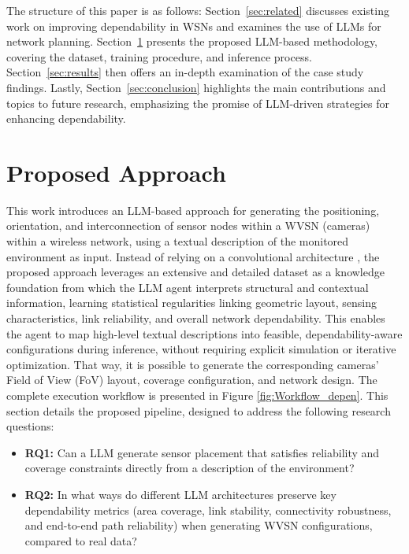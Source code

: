 The structure of this paper is as follows: Section~\ref{sec:related} discusses existing work on improving dependability in WSNs and examines the use of LLMs for network planning. Section~\ref{sec:approach} presents the proposed LLM-based methodology, covering the dataset, training procedure, and inference process. Section~\ref{sec:results} then offers an in-depth examination of the case study findings. Lastly, Section~\ref{sec:conclusion} highlights the main contributions and topics to future research, emphasizing the promise of LLM-driven strategies for enhancing dependability.












\section{Proposed Approach} \label{sec:approach}

This work introduces an LLM-based approach for generating the positioning, orientation, and interconnection of sensor nodes within a WVSN (cameras) within a wireless network, using a textual description of the monitored environment as input. Instead of relying on a convolutional architecture \cite{DepML2025}, the proposed approach leverages an extensive and detailed dataset as a knowledge foundation from which the LLM agent interprets structural and contextual information, learning statistical regularities linking geometric layout, sensing characteristics, link reliability, and overall network dependability. This enables the agent to map high-level textual descriptions into feasible, dependability-aware configurations during inference, without requiring explicit simulation or iterative optimization. That way, it is possible to generate the corresponding cameras' Field of View (FoV) layout, coverage configuration, and network design. The complete execution workflow is presented in Figure \ref{fig:Workflow_depen}. This section details the proposed pipeline, designed to address the following research questions:


\begin{itemize}
\item \textbf{RQ1:} Can a LLM generate sensor placement that satisfies reliability and coverage constraints directly from a description of the environment?

\item \textbf{RQ2:} In what ways do different LLM architectures preserve key dependability metrics (area coverage, link stability, connectivity robustness, and end-to-end path reliability) when generating WVSN configurations, compared to real data? 
\end{itemize}

